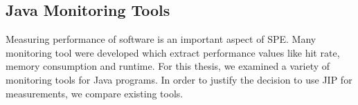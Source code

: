 




\subsection{Java Monitoring Tools}
\label{monitoring_tools}

Measuring performance of software is an important aspect of \ac{SPE}. Many monitoring tool were developed which extract performance values like hit rate, memory consumption and runtime. For this thesis, we examined a variety of monitoring tools for Java programs. In order to justify the decision to use \ac{JIP} for measurements, we compare existing tools.

